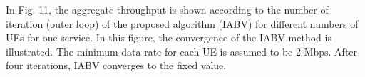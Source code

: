 \documentclass[lettersize,journal]{IEEEtran}
\begin{document}

In Fig. 11, the aggregate throughput is shown according to the number of iteration (outer loop) of the
proposed algorithm (IABV) for different numbers of UEs for one service. In this figure, the convergence of the IABV method is illustrated. The minimum data rate for each UE is assumed to be 2 Mbps.
After four iterations, IABV converges to the fixed value.
\end{document}
